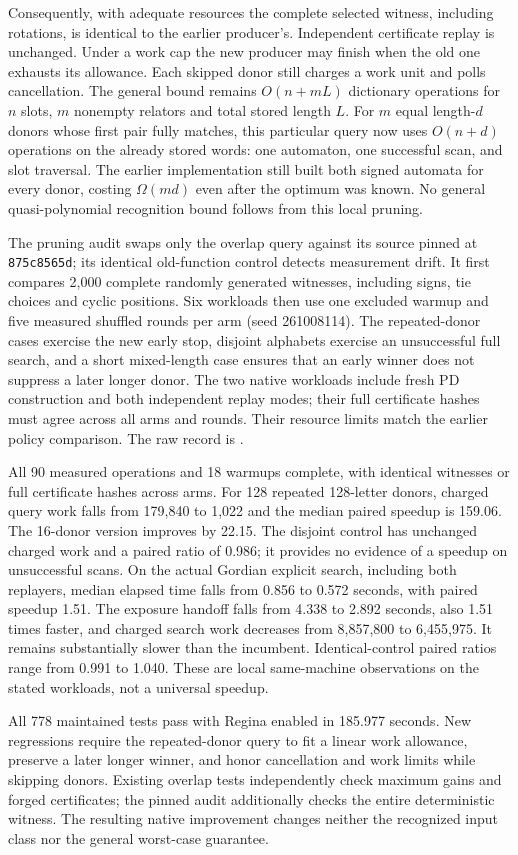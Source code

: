 Consequently, with adequate resources the complete selected witness,
including rotations, is identical to the earlier producer's. Independent
certificate replay is unchanged. Under a work cap the new producer may
finish when the old one exhausts its allowance. Each skipped donor still
charges a work unit and polls cancellation. The general bound remains
$O(n+mL)$ dictionary operations for $n$ slots, $m$ nonempty relators and
total stored length $L$. For $m$ equal length-$d$ donors whose first pair
fully matches, this particular query now uses $O(n+d)$ operations on the
already stored words: one automaton, one successful scan, and slot traversal.
The earlier implementation still built both signed automata for every donor,
costing $\Omega(md)$ even after the optimum was known. No general
quasi-polynomial recognition bound follows from this local pruning.



The pruning audit swaps only the overlap query against its source pinned at
\texttt{875c8565d}; its identical old-function control detects measurement
drift. It first compares 2,000 complete randomly generated witnesses,
including signs, tie choices and cyclic positions. Six workloads then use
one excluded warmup and five measured shuffled rounds per arm (seed
261008114). The repeated-donor cases exercise the new early stop, disjoint
alphabets exercise an unsuccessful full search, and a short mixed-length
case ensures that an early winner does not suppress a later longer donor.
The two native workloads include fresh PD construction and both independent
replay modes; their full certificate hashes must agree across all arms and
rounds. Their resource limits match the earlier policy comparison. The raw
record is .

All 90 measured operations and 18 warmups complete, with identical witnesses
or full certificate hashes across arms. For 128 repeated 128-letter donors,
charged query work falls from 179,840 to 1,022 and the median paired speedup
is 159.06. The 16-donor version improves by 22.15. The disjoint control has
unchanged charged work and a paired ratio of 0.986; it provides no evidence
of a speedup on unsuccessful scans. On the actual Gordian explicit search,
including both replayers, median elapsed time falls from 0.856 to 0.572
seconds, with paired speedup 1.51. The exposure handoff falls from 4.338 to
2.892 seconds, also 1.51 times faster, and charged search work decreases from
8,857,800 to 6,455,975. It remains substantially slower than the incumbent.
Identical-control paired ratios range from 0.991 to 1.040. These are local
same-machine observations on the stated workloads, not a universal speedup.

All 778 maintained tests pass with Regina enabled in 185.977 seconds.
New regressions require the repeated-donor query to fit a linear work
allowance, preserve a later longer winner, and honor cancellation and work
limits while skipping donors. Existing overlap tests independently check
maximum gains and forged certificates; the pinned audit additionally checks
the entire deterministic witness. The resulting native improvement changes
neither the recognized input class nor the general worst-case guarantee.
